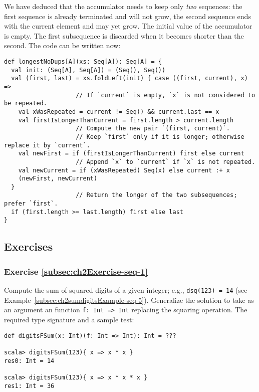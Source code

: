 We have deduced that the accumulator needs to keep only \emph{two}
sequences: the first sequence is already terminated and will not grow,
the second sequence ends with the current element and may yet grow.
The initial value of the accumulator is empty. The first subsequence
is discarded when it becomes shorter than the second. The code can
be written now:
\begin{lstlisting}
def longestNoDups[A](xs: Seq[A]): Seq[A] = {
  val init: (Seq[A], Seq[A]) = (Seq(), Seq())
  val (first, last) = xs.foldLeft(init) { case ((first, current), x) =>
                    // If `current` is empty, `x` is not considered to be repeated.
    val xWasRepeated = current != Seq() && current.last == x
    val firstIsLongerThanCurrent = first.length > current.length
                    // Compute the new pair `(first, current)`.
                    // Keep `first` only if it is longer; otherwise replace it by `current`.
    val newFirst = if (firstIsLongerThanCurrent) first else current
                    // Append `x` to `current` if `x` is not repeated.
    val newCurrent = if (xWasRepeated) Seq(x) else current :+ x
    (newFirst, newCurrent)
  }
                    // Return the longer of the two subsequences; prefer `first`.
  if (first.length >= last.length) first else last
}
\end{lstlisting}


\subsection{Exercises}

\subsubsection{Exercise \label{subsec:ch2Exercise-seq-1}\ref{subsec:ch2Exercise-seq-1}}

Compute the sum of squared digits of a given integer; e.g., \lstinline!dsq(123) = 14!
(see Example~\ref{subsec:ch2sumdigitsExample-seq-5}). Generalize
the solution to take as an argument an function \lstinline!f: Int => Int!
replacing the squaring operation. The required type signature and
a sample test:
\begin{lstlisting}
def digitsFSum(x: Int)(f: Int => Int): Int = ???

scala> digitsFSum(123){ x => x * x }
res0: Int = 14

scala> digitsFSum(123){ x => x * x * x }
res1: Int = 36
\end{lstlisting}


